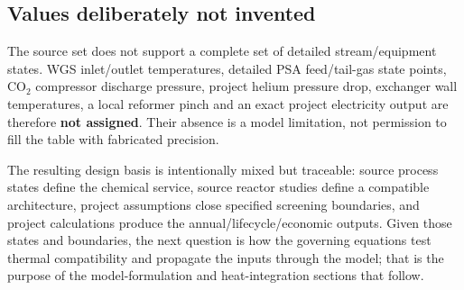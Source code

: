 \subsection{Values deliberately not invented}
The source set does not support a complete set of detailed stream/equipment states. WGS inlet/outlet temperatures, detailed PSA feed/tail-gas state points, CO$_2$ compressor discharge pressure, project helium pressure drop, exchanger wall temperatures, a local reformer pinch and an exact project electricity output are therefore \textbf{not assigned}. Their absence is a model limitation, not permission to fill the table with fabricated precision.

The resulting design basis is intentionally mixed but traceable: source process states define the chemical service, source reactor studies define a compatible architecture, project assumptions close specified screening boundaries, and project calculations produce the annual/lifecycle/economic outputs. Given those states and boundaries, the next question is how the governing equations test thermal compatibility and propagate the inputs through the model; that is the purpose of the model-formulation and heat-integration sections that follow.